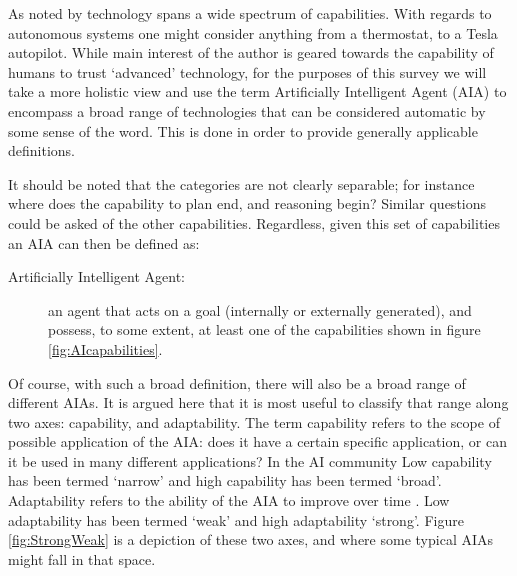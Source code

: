     As noted by \citet{Tripp2011-cq} technology spans a wide spectrum of capabilities. With regards to autonomous systems one might consider anything from a thermostat, to a Tesla autopilot. While main interest of the author is geared towards the capability of humans to trust `advanced' technology, for the purposes of this survey we will take a more holistic view and use the term Artificially Intelligent Agent (AIA) to encompass a broad range of technologies that can be considered automatic by some sense of the word. This is done in order to provide generally applicable definitions.

    It should be noted that the categories are not clearly separable; for instance where does the capability to plan end, and reasoning begin? Similar questions could be asked of the other capabilities. Regardless, given this set of capabilities an AIA can then be defined as:
    
    \begin{description}
        \item[Artificially Intelligent Agent:] an agent that acts on a goal (internally or externally generated), and possess, to some extent, at least one of the capabilities shown in figure \ref{fig:AIcapabilities}.
    \end{description}

    Of course, with such a broad definition, there will also be a broad range of different AIAs. It is argued here that it is most useful to classify that range along two axes: capability, and adaptability. The term capability refers to the scope of possible application of the AIA: does it have a certain specific application, or can it be used in many different applications? In the AI community Low capability has been termed `narrow' and high capability has been termed `broad'. Adaptability refers to the ability of the AIA to improve over time . Low adaptability has been termed `weak' and high adaptability `strong'. Figure \ref{fig:StrongWeak} is a depiction of these two axes, and where some typical AIAs might fall in that space.

